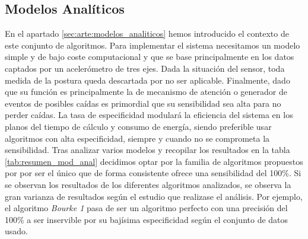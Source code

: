 \subsection{Modelos Analíticos}

En el apartado \ref{sec:arte:modelos_analiticos} hemos introducido el contexto de este conjunto de algoritmos. Para implementar el sistema necesitamos un modelo simple y de bajo coste computacional y que se base principalmente en los datos captados por un acelerómetro de tres ejes. Dada la situación del sensor, toda medida de la postura queda descartada por no ser aplicable. Finalmente, dado que su función es principalmente la de mecanismo de atención o generador de eventos de posibles caídas es primordial que su sensibilidad sea alta para no perder caídas. La tasa de especificidad modulará la eficiencia del sistema en los planos del tiempo de cálculo y consumo de energía, siendo preferible usar algoritmos con alta especificidad, siempre y cuando no se comprometa la sensibilidad. Tras analizar varios modelos y recopilar los resultados en la tabla \ref{tab:resumen_mod_anal} decidimos optar por la familia de algoritmos propuestos por \cite{Bourke2006} por ser el único que de forma consistente ofrece una sensibilidad del 100\%. Si se observan los resultados de los diferentes algoritmos analizados, se observa la gran varianza de resultados según el estudio que realizase el análisis. Por ejemplo, el algoritmo \textit{Bourke 1} pasa de ser un algoritmo perfecto con una precisión del 100\% a ser inservible por su bajísima especificidad según el conjunto de datos usado.

